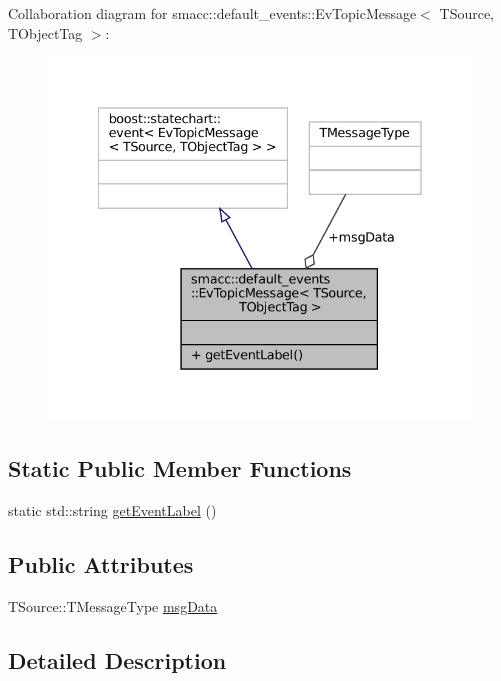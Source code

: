 Collaboration diagram for smacc\+:\+:default\+\_\+events\+:\+:Ev\+Topic\+Message$<$ T\+Source, T\+Object\+Tag $>$\+:
\nopagebreak
\begin{figure}[H]
\begin{center}
\leavevmode
\includegraphics[width=335pt]{structsmacc_1_1default__events_1_1EvTopicMessage__coll__graph}
\end{center}
\end{figure}
\subsection*{Static Public Member Functions}
\begin{DoxyCompactItemize}
\item 
static std\+::string \hyperlink{structsmacc_1_1default__events_1_1EvTopicMessage_afaa5fc76f1c6c3eaf30deb8aa58508c0}{get\+Event\+Label} ()
\end{DoxyCompactItemize}
\subsection*{Public Attributes}
\begin{DoxyCompactItemize}
\item 
T\+Source\+::\+T\+Message\+Type \hyperlink{structsmacc_1_1default__events_1_1EvTopicMessage_a82384568b702a0c3a3dc2fbe7eeefea9}{msg\+Data}
\end{DoxyCompactItemize}


\subsection{Detailed Description}
